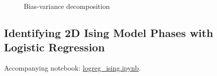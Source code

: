 \begin{figure}[H]
\centering
{}
\qquad
{}
\caption{Bias-variance decomposition}
\label{fig:bias_var__1d}
\end{figure}

\subsection{Identifying 2D Ising Model Phases with Logistic Regression}\label{sec:results logreg}
Accompanying notebook: \href{https://github.com/nicolossus/FYS-STK4155-Project2/blob/master/notebooks/logreg_ising.ipynb}{logreg\_ising.ipynb}. 

